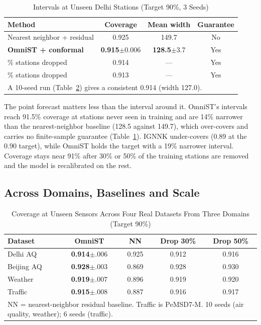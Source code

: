 \documentclass[journal,twoside,web]{ieeecolor}
\begin{document}
\begin{table}[htbp]
\caption{Intervals at Unseen Delhi Stations (Target 90\%, 3 Seeds)}
\centering
\footnotesize
\setlength{\tabcolsep}{4pt}
\begin{tabular}{lccc}
\toprule
\textbf{Method} & \textbf{Coverage} & \textbf{Mean width} & \textbf{Guarantee} \\
\midrule
Nearest neighbor + residual & 0.925 & 149.7 & No \\
\textbf{OmniST + conformal} & \textbf{0.915}$\pm$0.006 & \textbf{128.5}$\pm$3.7 & Yes \\
\quad 30\% stations dropped & 0.914 & --- & Yes \\
\quad 50\% stations dropped & 0.913 & --- & Yes \\
\bottomrule
\multicolumn{4}{p{0.9\columnwidth}}{\footnotesize A 10-seed run (Table~\ref{tab:multidomain}) gives a
consistent 0.914 (width 127.0).} \\
\end{tabular}
\label{tab:conformal}
\end{table}

The point forecast matters less than the interval around it. OmniST's intervals reach 91.5\%
coverage at stations never seen in training and are 14\% narrower than the nearest-neighbor baseline
(128.5 against 149.7), which over-covers and carries no finite-sample guarantee
(Table~\ref{tab:conformal}). IGNNK under-covers (0.89 at the 0.90 target), while OmniST holds the
target with a 19\% narrower interval. Coverage stays near 91\% after 30\% or 50\% of the training
stations are removed and the model is recalibrated on the rest.

\subsection{Across Domains, Baselines and Scale}
\label{sec:robustness}

\begin{table}[htbp]
\caption{Coverage at Unseen Sensors Across Four Real Datasets From Three Domains (Target 90\%)}
\centering
\footnotesize
\setlength{\tabcolsep}{4pt}
\begin{tabular}{lcccc}
\toprule
\textbf{Dataset} & \textbf{OmniST} & \textbf{NN} & \textbf{Drop 30\%} & \textbf{Drop 50\%} \\
\midrule
Delhi AQ   & \textbf{0.914}$\pm$.006 & 0.925 & 0.912 & 0.916 \\
Beijing AQ & \textbf{0.928}$\pm$.003 & 0.869 & 0.928 & 0.930 \\
Weather    & \textbf{0.919}$\pm$.007 & 0.896 & 0.919 & 0.920 \\
Traffic    & \textbf{0.915}$\pm$.008 & 0.887 & 0.916 & 0.917 \\
\bottomrule
\multicolumn{5}{p{0.95\columnwidth}}{\footnotesize NN = nearest-neighbor residual baseline. Traffic
is PeMSD7-M. 10 seeds (air quality, weather); 6 seeds (traffic).} \\
\end{tabular}
\label{tab:multidomain}
\end{table}
\end{document}
